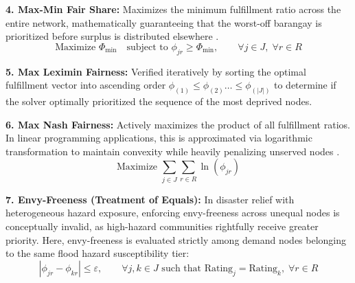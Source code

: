 \textbf{4. Max-Min Fair Share:} Maximizes the minimum fulfillment ratio across the entire network, mathematically guaranteeing that the worst-off barangay is prioritized before surplus is distributed elsewhere \cite{vitoriano2011}.
\begin{equation}
    \text{Maximize } \Phi_{\min} \quad \text{subject to } \phi_{jr} \geq \Phi_{\min}, \qquad \forall j \in J, \; \forall r \in R
    \label{eq:max_min_fairness}
\end{equation}

\textbf{5. Max Leximin Fairness:} Verified iteratively by sorting the optimal fulfillment vector into ascending order $\phi_{(1)} \le \phi_{(2)} \dots \le \phi_{(|J|)}$ to determine if the solver optimally prioritized the sequence of the most deprived nodes. 

\textbf{6. Max Nash Fairness:} Actively maximizes the product of all fulfillment ratios. In linear programming applications, this is approximated via logarithmic transformation to maintain convexity while heavily penalizing unserved nodes \cite{vitoriano2011}.
\begin{equation}
    \text{Maximize } \sum_{j \in J} \sum_{r \in R} \ln(\phi_{jr})
    \label{eq:max_nash}
\end{equation}

\textbf{7. Envy-Freeness (Treatment of Equals):} In disaster relief with heterogeneous hazard exposure, enforcing envy-freeness across unequal nodes is conceptually invalid, as high-hazard communities rightfully receive greater priority. Here, envy-freeness is evaluated strictly among demand nodes belonging to the same flood hazard susceptibility tier:
\begin{equation}
    |\phi_{jr} - \phi_{kr}| \le \varepsilon, \qquad \forall j, k \in J \text{ such that } \text{Rating}_j = \text{Rating}_k, \; \forall r \in R
    \label{eq:envy_freeness}
\end{equation}

